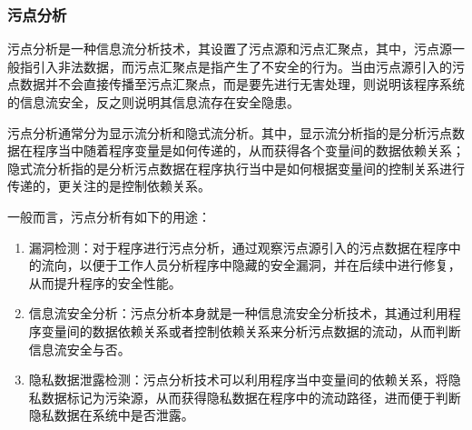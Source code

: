 \subsubsection{污点分析}

污点分析是一种信息流分析技术，其设置了污点源和污点汇聚点，其中，污点源一般指引入非法数据，而污点汇聚点是指产生了不安全的行为。当由污点源引入的污点数据并不会直接传播至污点汇聚点，而是要先进行无害处理，则说明该程序系统的信息流安全，反之则说明其信息流存在安全隐患。

污点分析通常分为显示流分析和隐式流分析。其中，显示流分析指的是分析污点数据在程序当中随着程序变量是如何传递的，从而获得各个变量间的数据依赖关系；隐式流分析指的是分析污点数据在程序执行当中是如何根据变量间的控制关系进行传递的，更关注的是控制依赖关系。

一般而言，污点分析有如下的用途：
\begin{enumerate}
\item 漏洞检测：对于程序进行污点分析，通过观察污点源引入的污点数据在程序中的流向，以便于工作人员分析程序中隐藏的安全漏洞，并在后续中进行修复，从而提升程序的安全性能。
\item 信息流安全分析：污点分析本身就是一种信息流安全分析技术，其通过利用程序变量间的数据依赖关系或者控制依赖关系来分析污点数据的流动，从而判断信息流安全与否。
\item 隐私数据泄露检测：污点分析技术可以利用程序当中变量间的依赖关系，将隐私数据标记为污染源，从而获得隐私数据在程序中的流动路径，进而便于判断隐私数据在系统中是否泄露。
\end{enumerate}